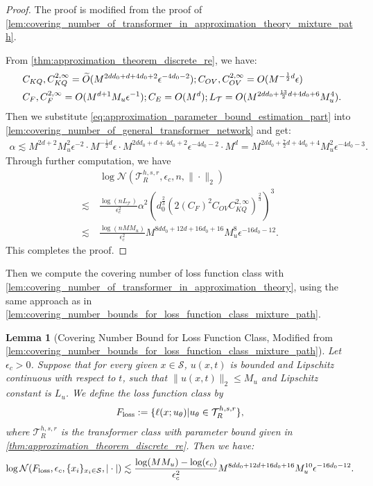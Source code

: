 \documentclass[12pt]{article}
\numberwithin{equation}{section}
\let\tilde\widetilde
\newcommand{\wt}{\widetilde}
\renewcommand{\tilde}{\wt}
\theoremstyle{theoremstyle}
\newtheorem{lemma}{Lemma}[section]
\numberwithin{equation}{section}
\numberwithin{theorem}{section}
\numberwithin{proposition}{section}
\numberwithin{definition}{section}
\numberwithin{lemma}{section}
\numberwithin{assumption}{section}
\numberwithin{remark}{section}
\begin{document}
\begin{proof}
The proof is modified from the proof of \cref{lem:covering_number_of_transformer_in_approximation_theory_mixture_path}.

From \cref{thm:approximation_theorem_discrete_re}, we have:
\begin{align}\label{eq:approximation_parameter_bound_estimation_part}
    & ~C_{KQ},C^{2,\infty}_{KQ}=\tilde{O}(M^{2dd_0+d+4d_0+2}\epsilon^{-4d_0-2});C_{OV},C^{2,\infty}_{OV}=O(M^{-\frac{1}{2}d}\epsilon) \notag\\
    & ~C_{F},C^{2,\infty}_{F}=O(M^{d+1}M_u\epsilon^{-1});C_E=O(M^d);L_\mathcal{T}=O(M^{2dd_0+\frac{13}{2}d+4d_0+6}M_u^4).
\end{align}
Then we substitute \eqref{eq:approximation_parameter_bound_estimation_part} into \cref{lem:covering_number_of_general_transformer_network} and get:
\begin{align*}
\alpha \lesssim M^{2d+2}M_u^2\epsilon^{-2}\cdot M^{-\frac{1}{2}d}\epsilon\cdot M^{2dd_0+d+4d_0+2}\epsilon^{-4d_0-2}\cdot M^d=M^{2dd_0+\frac{7}{2}d+4d_0+4}M_u^2\epsilon^{-4d_0-3}.
\end{align*}
Through further computation, we have
\begin{align*}
    & ~ \log\mathcal{N}(\mathcal{T}^{h,s,r}_R,\epsilon_c,n,\|\cdot\|_2) \\
    \lesssim & ~
    \frac{\log(nL_\mathcal{T})}{\epsilon_c^2}\alpha^2(d_0^\frac{2}{3}(2(C_F)^2C_{OV}C_{KQ}^{2,\infty})^\frac{2}{3})^3 \\
    \lesssim & ~
    \frac{\log(nMM_u)}{\epsilon_c^2}M^{8dd_0+12d+16d_0+16}M_u^8\epsilon^{-16d_0-12}.
\end{align*}
This completes the proof.
\end{proof}

Then we compute the covering number of loss function class with \cref{lem:covering_number_of_transformer_in_approximation_theory}, using the same approach as in \cref{lem:covering_number_bounds_for_loss_function_class_mixture_path}.

\begin{lemma}[Covering Number Bound for Loss Function Class, Modified from \cref{lem:covering_number_bounds_for_loss_function_class_mixture_path}]\label{lem:covering_number_bounds_for_loss_function_class}
Let $\epsilon_c>0$.
Suppose that for every given $x\in \mathcal{S}$, $u(x,t)$ is bounded and Lipschitz continuous with respect to $t$, such that $\|u(x,t)\|_2\leq M_u$ and Lipschitz constant is $L_u$.
We define the loss function class by 
\begin{align*}
F_{\rm loss}:=\{\ell(x;u_\theta)|u_\theta\in\mathcal{T}^{h,s,r}_R\},
\end{align*}
where $\mathcal{T}^{h,s,r}_R$ is the transformer class with parameter bound given in \cref{thm:approximation_theorem_discrete_re}.
Then we have:
\begin{align*}
    \log\mathcal{N}(F_{\rm loss},\epsilon_c,\{x_i\}_{x_i\in \mathcal{S}},|\cdot|)\lesssim \frac{\log(MM_u)-\log(\epsilon_c)}{\epsilon_c^2}M^{8dd_0+12d+16d_0+16}M_u^{10}\epsilon^{-16d_0-12}.
\end{align*}
\end{lemma}
\end{document}

